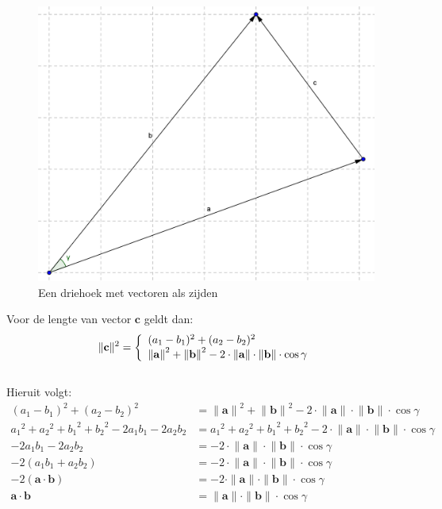 \documentclass[12pt,a4paper]{article}
\begin{document}
	\begin{figure}[h]
		\centerline{\includegraphics[width=\textwidth]{Plaatjes/cosinusregel-inproduct.png}}
		\caption{Een driehoek met vectoren als zijden}
		\label{cosinusregel-inproduct}
	\end{figure}
	
	Voor de lengte van vector $\mathbf{c}$ geldt dan:
 	\begin{equation}
		\begin{aligned}
			\|\mathbf{c}\|^2 = \left\{ 
				\begin{array}{l l}
 	 				(a_1-b_1)^2+(a_2-b_2)^2 \\
  					{\|\mathbf{a}\|}^2 + {\|\mathbf{b}\|}^2 - 2 \cdot \|\mathbf{a}\| \cdot \|\mathbf{b}\| \cdot \cos\gamma 
 	 			\end{array} 
 	 		\right.
		\end{aligned}
	\end{equation}
	\\Hieruit volgt:
	\begin{equation}
		\label{inproduct-cosinus}
		\begin{aligned}
			(a_1-b_1)^2 + (a_2-b_2)^2 &= {\|\mathbf{a}\|}^2 + {\|\mathbf{b}\|}^2 - 2 \cdot {\|\mathbf{a}\|} \cdot {\|\mathbf{b}\|} \cdot \cos\gamma \\
			{a_1}^2 + {a_2}^2+ {b_1}^2 + {b_2}^2 - 2a_1b_1 - 2a_2b_2 &= {a_1}^2 + {a_2}^2+ {b_1}^2 + {b_2}^2 - 2 \cdot {\|\mathbf{a}\|} \cdot {\|\mathbf{b}\|} \cdot \cos\gamma \\
			-2a_1b_1 - 2a_2b_2 &= - 2 \cdot {\|\mathbf{a}\|} \cdot {\|\mathbf{b}\|} \cdot \cos\gamma \\
			-2(a_1b_1 + a_2b_2) &= - 2 \cdot {\|\mathbf{a}\|} \cdot {\|\mathbf{b}\|} \cdot \cos\gamma \\
			-2(\mathbf{a} \cdot \mathbf{b}) &= - 2 \cdot \|\mathbf{a}\| \cdot \|\mathbf{b}\| \cdot \cos\gamma \\
			\mathbf{a} \cdot \mathbf{b} &= \|\mathbf{a}\| \cdot \|\mathbf{b}\| \cdot \cos\gamma\\
		\end{aligned}
	\end{equation}
	
\end{document}
